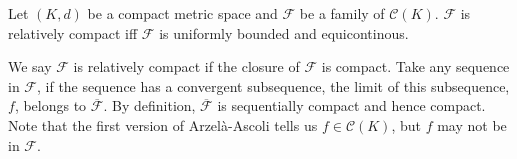 \begin{theorem}
    Let $(K,d)$ be a compact metric space and $\mathcal{F}$ be a family of $\mathcal{C}(K)$. 
    $\mathcal{F}$ is relatively compact iff $\mathcal{F}$ is uniformly bounded and equicontinous.
\end{theorem}

\begin{remark}
    We say $\mathcal{F}$ is relatively compact if the closure of $\mathcal{F}$ is compact.
    Take any sequence in $\mathcal{F}$, if the sequence has a convergent subsequence, the limit of this subsequence, $f$, belongs to $\overline{\mathcal{F}}$. By definition, $\overline{\mathcal{F}}$ is sequentially compact and hence compact.
    Note that the first version of Arzelà-Ascoli tells us $f\in\mathcal{C}(K)$, but $f$ may not be in $\mathcal{F}.$
\end{remark}


